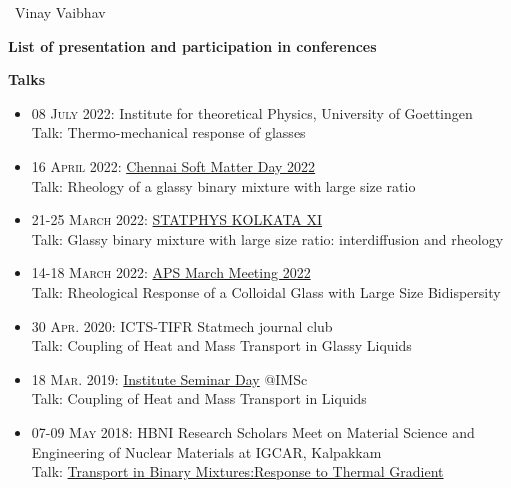 \vspace{2.0cm}
~\hfill Vinay Vaibhav\hspace{2.0cm}

\newpage
\thispagestyle{plain}
\centerline{{\bf {\Large List of presentation and participation in conferences}}}

{\bf {\large Talks}}
\begin{small}
\begin{itemize}

\item \textsc{08 July 2022: } Institute for theoretical Physics, University of Goettingen\\
\footnotesize{ Talk: Thermo-mechanical response of glasses}

\item \textsc{16 April 2022: } {\href{https://che.iitm.ac.in/chennaisoft/}{Chennai Soft Matter Day 2022}}\\
\footnotesize{ Talk: Rheology of a glassy binary mixture with large size ratio}

\item \textsc{21-25 March 2022: } {\href{https://sites.google.com/iiserkol.ac.in/statphys/home}{STATPHYS KOLKATA XI}}\\
\footnotesize{ Talk: Glassy binary mixture with large size ratio: interdiffusion and rheology}

\item \textsc{14-18 March 2022: } {\href{https://meetings.aps.org/Meeting/MAR22/Session/W25.5}{APS March Meeting 2022}}\\
\footnotesize{ Talk: Rheological Response of a Colloidal Glass with Large Size Bidispersity}

\item \textsc{30 Apr. 2020: }  ICTS-TIFR Statmech journal club\\
\footnotesize{Talk: Coupling of Heat and Mass Transport in Glassy Liquids}

\item \textsc{18 Mar. 2019: } {\href{https://www.imsc.res.in/~semweek/semdays_2019.html} {Institute Seminar Day}} @IMSc\\
\footnotesize{Talk: Coupling of Heat and Mass Transport in Liquids}

\item \textsc{07-09 May 2018: } HBNI Research Scholars Meet on Material Science and Engineering of Nuclear Materials at  IGCAR, Kalpakkam\\
\footnotesize{ Talk:} {\href{https://www.imsc.res.in/~vinayv/documents/vinayVaibhav_O21_IMSc.pdf}{Transport in Binary Mixtures:Response to Thermal Gradient}}

\end{itemize}
\end{small}

